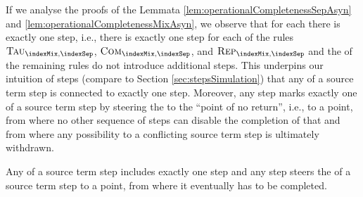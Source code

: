 \documentclass[]{llncs}
\begin{document}
If we analyse the proofs of the Lemmata \ref{lem:operationalCompletenessSepAsyn} and \ref{lem:operationalCompletenessMixAsyn}, we observe that for each \simulation there is exactly one \nonAdmin step, i.e., there is exactly one \nonAdmin step for each of the rules $ \textsc{Tau}_{\indexMix, \indexSep} $, $ \textsc{Com}_{\indexMix, \indexSep}  $, and $ \textsc{Rep}_{\indexMix, \indexSep}  $ and the \simulation of the remaining rules do not introduce additional \nonAdmin steps. This underpins our intuition of \nonAdmin steps (compare to Section \ref{sec:stepsSimulation}) that any \simulation of a source term step is connected to exactly one \nonAdmin step. Moreover, any \nonAdmin step marks exactly one \simulation of a source term step by steering the \simulation to the ``point of no return'', i.e., to a point, from where no other sequence of steps can disable the completion of that \simulation and from where any possibility to \simulate a conflicting source term step is ultimately withdrawn.

\begin{lemma} \label{lem:simulationVSNonAdminStep}
	Any \simulation of a source term step includes exactly one \nonAdmin step and any \nonAdmin step steers the \simulation of a source term step to a point, from where it eventually has to be completed.
\end{lemma}
\end{document}
